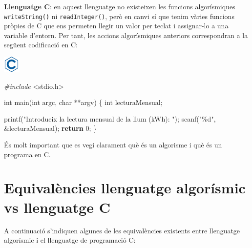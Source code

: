 \documentclass[]{book}
\newenvironment{Shaded}{\begin{snugshade}}{\end{snugshade}}
\newcommand{\ControlFlowTok}[1]{\textcolor[rgb]{0.13,0.29,0.53}{\textbf{#1}}}
\newcommand{\DataTypeTok}[1]{\textcolor[rgb]{0.13,0.29,0.53}{#1}}
\newcommand{\DecValTok}[1]{\textcolor[rgb]{0.00,0.00,0.81}{#1}}
\newcommand{\ImportTok}[1]{#1}
\newcommand{\NormalTok}[1]{#1}
\newcommand{\PreprocessorTok}[1]{\textcolor[rgb]{0.56,0.35,0.01}{\textit{#1}}}
\newcommand{\StringTok}[1]{\textcolor[rgb]{0.31,0.60,0.02}{#1}}
\begin{document}
\textbf{Llenguatge C}: en aquest llenguatge no existeixen les funcions algorísmiques \texttt{writeString()} ni \texttt{readInteger()}, però en canvi sí que tenim vàries funcions pròpies de C que ens permeten llegir un valor per teclat i assignar-lo a una variable d'entorn. Per tant, les accions algorísmiques anteriors correspondran a la següent codificació en C:

\includegraphics{./img/c.png}

\begin{Shaded}
\begin{Highlighting}[]
\PreprocessorTok{\#include }\ImportTok{\textless{}stdio.h\textgreater{}}

\DataTypeTok{int}\NormalTok{ main(}\DataTypeTok{int}\NormalTok{ argc, }\DataTypeTok{char}\NormalTok{ **argv) \{ }
    \DataTypeTok{int}\NormalTok{ lecturaMensual;}

\NormalTok{    printf(}\StringTok{"Introdueix la lectura mensual de la llum (kWh): "}\NormalTok{);}
\NormalTok{    scanf(}\StringTok{"\%d"}\NormalTok{, \&lecturaMensual);}
    \ControlFlowTok{return} \DecValTok{0}\NormalTok{;}
\NormalTok{\}}
\end{Highlighting}
\end{Shaded}

És molt important que es vegi clarament què és un algorisme i què és un programa en C.

\hypertarget{equivalencies-llenguatge-algorismic-vs-llenguatge-c}{%
\section{Equivalències llenguatge algorísmic vs llenguatge C}\label{equivalencies-llenguatge-algorismic-vs-llenguatge-c}}

A continuació s'indiquen algunes de les equivalències existents entre llenguatge algorísmic i el llenguatge de programació C:
\end{document}
